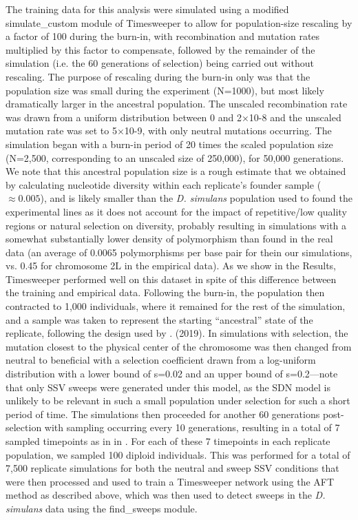The training data for this analysis were simulated using a modified simulate\_custom module of Timesweeper to allow for population-size rescaling by a factor of 100 during the burn-in, with recombination and mutation rates multiplied by this factor to compensate, followed by the remainder of the simulation (i.e. the 60 generations of selection) being carried out without rescaling. The purpose of rescaling during the burn-in only was that the population size was small during the experiment (N=1000), but most likely dramatically larger in the ancestral population. The unscaled recombination rate was drawn from a uniform distribution between 0 and 2×10-8 and the unscaled mutation rate was set to 5×10-9, with only neutral mutations occurring. The simulation began with a burn-in period of 20 times the scaled population size (N=2,500, corresponding to an unscaled size of 250,000), for 50,000 generations. We note that this ancestral population size is a rough estimate that we obtained by calculating nucleotide diversity within each replicate’s founder sample ($\approx 0.005$), and is likely smaller than the \textit{D. simulans} population used to found the experimental lines as it does not account for the impact of repetitive/low quality regions or natural selection on diversity, probably resulting in simulations with a somewhat substantially lower density of polymorphism than found in the real data (an average of 0.0065 polymorphisms per base pair for thein our simulations, vs. 0.45 for chromosome 2L in the empirical data). As we show in the Results, Timesweeper performed well on this dataset in spite of this difference between the training and empirical data. Following the burn-in, the population then contracted to 1,000 individuals, where it remained for the rest of the simulation, and a sample was taken to represent the starting “ancestral” state of the replicate, following the design used by \cite{barghiGeneticRedundancyFuels2019}. (2019). In simulations with selection, the mutation closest to the physical center of the chromosome was then changed from neutral to beneficial with a selection coefficient drawn from a log-uniform distribution with a lower bound of s=0.02 and an upper bound of s=0.2—note that only SSV sweeps were generated under this model, as the SDN model is unlikely to be relevant in such a small population under selection for such a short period of time. The simulations then proceeded for another 60 generations post-selection with sampling occurring every 10 generations, resulting in a total of 7 sampled timepoints as in in \cite{barghiGeneticRedundancyFuels2019}. For each of these 7 timepoints in each replicate population, we sampled 100 diploid individuals. This was performed for a total of 7,500 replicate simulations for both the neutral and sweep SSV conditions that were then processed and used to train a Timesweeper network using the AFT method as described above, which was then used to detect sweeps in the \textit{D. simulans} data using the find\_sweeps module.

